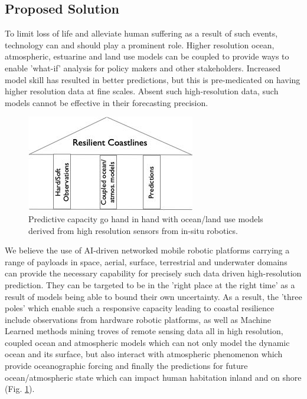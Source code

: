 \subsection*{Proposed Solution}

To limit loss of life and alleviate human suffering as a result of
such events, technology can and should play a prominent role. Higher
resolution ocean, atmospheric, estuarine and land use models can be
coupled to provide ways to enable 'what-if' analysis for policy makers
and other stakeholders. Increased model skill has resulted in better
predictions, but this is pre-medicated on having higher resolution
data at fine scales. Absent such high-resolution data, such models
cannot be effective in their forecasting precision. 

\begin{figure}
  \centering
  \includegraphics[scale=0.5]{fig/trioka.jpg}
  \caption{Predictive capacity go hand in hand with ocean/land use
    models derived from high resolution sensors from in-situ robotics.}
  \label{fig:tri}
\end{figure}

We believe the use of AI-driven networked mobile robotic platforms
carrying a range of payloads in space, aerial, surface, terrestrial
and underwater domains can provide the necessary capability for
precisely such data driven high-resolution prediction. They can be
targeted to be in the 'right place at the right time' as a result of
models being able to bound their own uncertainty. As a result, the
'three poles' which enable such a responsive capacity leading to
coastal resilience include observations from hardware robotic
platforms, as well as Machine Learned methods mining troves of remote
sensing data all in high resolution, coupled ocean and atmospheric
models which can not only model the dynamic ocean and its surface, but
also interact with atmospheric phenomenon which provide oceanographic
forcing and finally the predictions for future ocean/atmospheric state
which can impact human habitation inland and on shore
(Fig. \ref{fig:tri}).

